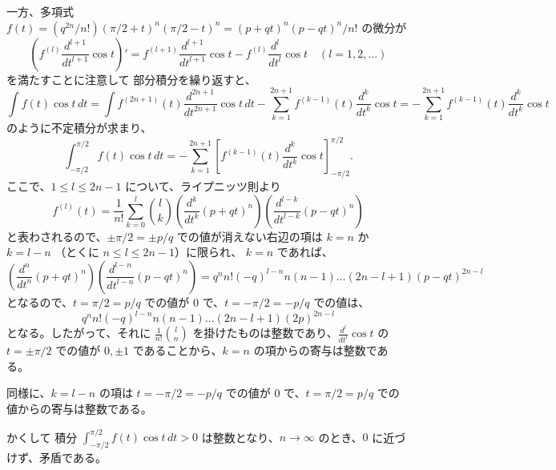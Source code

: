 \documentclass[a4paper]{jsarticle}
\theoremstyle{definition}
\theoremstyle{remark}
\begin{document}
一方、多項式 $f(t) = (q^{2n}/n!) (\pi/2 + t)^n (\pi/2 - t)^n = (p+qt)^n(p-qt)^n/n!$ の微分が
\[
  \left(f^{(l)} \frac{d^{l+1}}{dt^{l+1}} \cos t\right)' = f^{(l+1)} \frac{d^{l+1}}{dt^{l+1}} \cos t - f^{(l)} \frac{d^l}{dt^l} \cos t
    \quad
    (l = 1,2,\dots) 
\]
を満たすことに注意して 部分積分を繰り返すと、
\[
   \int f(t) \cos t\, dt
 = \int f^{(2n+1)}(t) \frac{d^{2n+1}}{dt^{2n+1}} \cos t\, dt - \sum_{k=1}^{2n+1} f^{(k-1)}(t) \frac{d^k}{dt^{k}} \cos t
= - \sum_{k=1}^{2n+1} f^{(k-1)}(t) \frac{d^k}{dt^{k}} \cos t
\]
のように不定積分が求まり、
\[
  \int_{-\pi/2}^{\pi/2} f(t) \cos t\, dt
= - \sum_{k=1}^{2n+1} \left[ f^{(k-1)}(t) \frac{d^k}{dt^{k}} \cos t \right]_{-\pi/2}^{\pi/2}. 
\]
ここで、$1 \leq l \leq 2n-1$ について、ライプニッツ則より
\[
  f^{(l)}(t) = \frac{1}{n!} \sum_{k=0}^l \binom{l}{k}
  \left( \frac{d^k}{dt^k} (p+qt)^n \right)
  \left( \frac{d^{l-k}}{dt^{l-k}} (p - qt)^n \right)
\]
と表わされるので、$\pm \pi/2 = \pm p/q$ での値が消えない右辺の項は $k = n$ か $k=l-n$ （とくに $n \leq l \leq 2n-1$）に限られ、
$k=n$ であれば、
\[
  \left( \frac{d^n}{dt^n} (p+qt)^n \right)
  \left( \frac{d^{l-n}}{dt^{l-n}} (p - qt)^n \right)
  = q^n n! (-q)^{l-n} n(n-1) \dots (2n-l+1) (p-qt)^{2n-l}
\]
となるので、$t = \pi/2 = p/q$ での値が $0$ で、$t = -\pi/2 = -p/q$ での値は、
\[
  q^n n! (-q)^{l-n} n(n-1) \dots (2n-l+1) (2p)^{2n-l}
\]
となる。したがって、それに $\frac{1}{n!} \binom{l}{n}$ を掛けたものは整数であり、$\frac{d^l}{dt^l}\cos t$ の $t=\pm \pi/2$ での値が $0,\pm 1$
であることから、$k=n$ の項からの寄与は整数である。

同様に、$k = l-n$ の項は $t = -\pi/2 = -p/q$ での値が $0$ で、$t = \pi/2 = p/q$ での値からの寄与は整数である。

かくして 積分 $\int_{-\pi/2}^{\pi/2} f(t) \cos t\, dt > 0$ は整数となり、$n \to \infty$ のとき、$0$ に近づけず、矛盾である。






\end{document}
